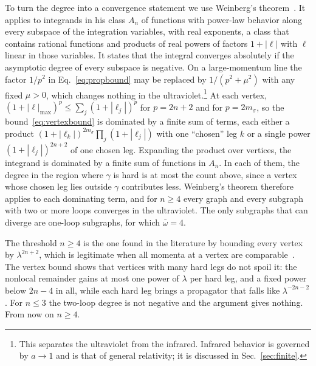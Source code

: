 \documentclass[aps,prd,10pt,twocolumn,superscriptaddress,nofootinbib,floatfix,longbibliography]{revtex4-2}
\begin{document}
To turn the degree into a convergence statement we use Weinberg's theorem~\cite{Weinberg1960}. It applies to integrands in his class $A_n$ of functions with power-law behavior along every subspace of the integration variables, with real exponents, a class that contains rational functions and products of real powers of factors $1+|\ell|$ with $\ell$ linear in those variables. It states that the integral converges absolutely if the asymptotic degree of every subspace is negative. On a large-momentum line the factor $1/p^2$ in Eq.~\eqref{eq:propbound} may be replaced by $1/(p^2+\mu^2)$ with any fixed $\mu>0$, which changes nothing in the ultraviolet.\footnote{This separates the ultraviolet from the infrared. Infrared behavior is governed by $a\to1$ and is that of general relativity; it is discussed in Sec.~\ref{sec:finite}.} At each vertex, $(1+|\ell|_{\max})^{p}\le\sum_j(1+|\ell_j|)^{p}$ for $p=2n+2$ and for $p=2m_\sigma$, so the bound~\eqref{eq:vertexbound} is dominated by a finite sum of terms, each either a product $(1+|\ell_k|)^{2m_\sigma}\prod_j(1+|\ell_j|)$ with one ``chosen'' leg $k$ or a single power $(1+|\ell_j|)^{2n+2}$ of one chosen leg. Expanding the product over vertices, the integrand is dominated by a finite sum of functions in $A_n$. In each of them, the degree in the region where $\gamma$ is hard is at most the count above, since a vertex whose chosen leg lies outside $\gamma$ contributes less. Weinberg's theorem therefore applies to each dominating term, and for $n\ge4$ every graph and every subgraph with two or more loops converges in the ultraviolet. The only subgraphs that can diverge are one-loop subgraphs, for which $\bar\omega=4$.

The threshold $n\ge4$ is the one found in the literature by bounding every vertex by $\lambda^{2n+2}$, which is legitimate when all momenta at a vertex are comparable~\cite{AsoreyLopezShapiro1997,Modesto2012}. The vertex bound shows that vertices with many hard legs do not spoil it: the nonlocal remainder gains at most one power of $\lambda$ per hard leg, and a fixed power below $2n-4$ in all, while each hard leg brings a propagator that falls like $\lambda^{-2n-2}$. For $n\le3$ the two-loop degree is not negative and the argument gives nothing. From now on $n\ge4$.
\end{document}

